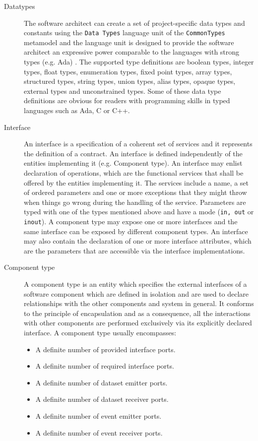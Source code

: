 \begin{description}
\item [Datatypes] The software architect can create a set of project-specific data types and constants using the \texttt{Data Types} language unit of the \texttt{CommonTypes} metamodel and the language unit is designed to provide the software architect an expressive power comparable to the languages with strong types (e.g. Ada) \cite{SpecMetamodel}. The supported type definitions are boolean types, integer types, float types, enumeration types, fixed point types, array types, structured types, string types, union types, alias types, opaque types, external types and unconstrained types. Some of these data type definitions are obvious for readers with programming skills in typed languages such as Ada, C or C++. 

\item [Interface] An interface is a specification of a coherent set of services and it represents the definition of a contract. An interface is defined independently of the entities implementing it (e.g. Component type). An interface may enlist declaration of operations, which are the functional services that shall be offered by the entities implementing it. The services include a name, a set of ordered parameters and one or more exceptions that they might throw when things go wrong during the handling of the service. Parameters are typed with one of the types mentioned above and have a mode (\texttt{in, out} or \texttt{inout}). A component type may expose one or more interfaces and the same interface can be exposed by different component types. An interface may also contain the declaration of one or more interface attributes, which are the parameters that are accessible via the interface implementations.

\item [Component type] A component type is an entity which specifies the external interfaces of a software component which are defined in isolation and are used to declare relationships with the other components and system in general. It conforms to the principle of encapsulation and as a consequence, all the interactions with other components are performed exclusively via its explicitly declared interface. A component type usually encompasses:
\begin{itemize}
\item A definite number of provided interface ports.
\item A definite number of required interface ports.
\item A definite number of dataset emitter ports.
\item A definite number of dataset receiver ports.
\item A definite number of event emitter ports.
\item A definite number of event receiver ports. 
\end{itemize}


\end{description}
